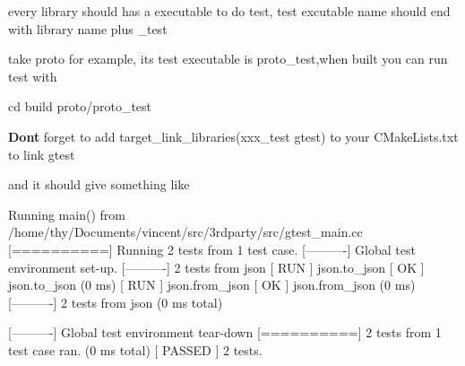 every library should has a executable to do test, test excutable name should end with library name plus {\ttfamily \+\_\+test}

take {\ttfamily proto} for example, its test executable is {\ttfamily proto\+\_\+test},when built you can run test with 
\begin{DoxyCode}
cd build
proto/proto\_test
\end{DoxyCode}
 {\bfseries Don\textquotesingle{}t} forget to add {\ttfamily target\+\_\+link\+\_\+libraries(xxx\+\_\+test gtest)} to your {\ttfamily C\+Make\+Lists.\+txt} to link {\ttfamily gtest}

and it should give something like 
\begin{DoxyCode}
Running main() from /home/thy/Documents/vincent/src/3rdparty/src/gtest\_main.cc
[==========] Running 2 tests from 1 test case.
[----------] Global test environment set-up.
[----------] 2 tests from json
[ RUN      ] json.to\_json
[       OK ] json.to\_json (0 ms)
[ RUN      ] json.from\_json
[       OK ] json.from\_json (0 ms)
[----------] 2 tests from json (0 ms total)

[----------] Global test environment tear-down
[==========] 2 tests from 1 test case ran. (0 ms total)
[  PASSED  ] 2 tests.
\end{DoxyCode}
 